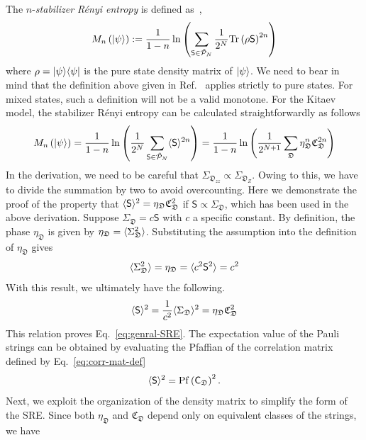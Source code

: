 The $n$-\textit{stabilizer R\'enyi entropy} is defined as~\cite{Leone-Oliviero-Hamma_2022},
\begin{equation}\label{eq:stab-renyi-def}
    M_{n}\left( | \psi \rangle \right) := 
    \frac{1}{1 - n} 
    \ln\left( 
        \sum_{\mathsf{S}\in\tilde{\mathcal{P}}_N}
        \frac{1}{2^N}
        \mathrm{Tr}\left( \rho\mathsf{S} \right)^{2n}
     \right)
\end{equation}
where $\rho = | \psi \rangle\langle \psi |$ is the pure state density matrix of $| \psi \rangle$. We need to bear in mind that the definition above given in Ref.~\cite{Leone-Oliviero-Hamma_2022} applies strictly to pure states. For mixed states, such a definition will not be a valid monotone. For the Kitaev model, the stabilizer R\'enyi entropy can be calculated straightforwardly as follows
\begin{equation}\label{eq:genral-SRE}
    M_{n}\left( | \psi \rangle \right) 
    = 
    \frac{1}{1 - n} 
    \ln\left( 
        \frac{1}{2^N} \sum_{\mathsf{S}\in\tilde{\mathcal{P}}_N}
        \langle \mathsf{S} \rangle^{2n}
     \right) 
    =
    \frac{1}{1 - n} 
    \ln\left( 
        \frac{1}{2^{N+1}}
        \sum_{\mathfrak{D}}
        \eta_\mathfrak{D}^n
        \mathfrak{C}_\mathfrak{D}^{2n}
     \right) 
\end{equation}
In the derivation, we need to be careful that $\Sigma_{\mathfrak{D}_{zz}} \propto \Sigma_{\mathfrak{D}_Z}$. Owing to this, we have to divide the summation by two to avoid overcounting. Here we demonstrate the proof of the property that $\langle \mathsf{S} \rangle^2 = \eta_\mathfrak{D}\mathfrak{C}_\mathfrak{D}^2$ if $\mathsf{S} \propto \Sigma_\mathfrak{D}$, which has been used in the above derivation.  Suppose $\Sigma_\mathfrak{D} = c\mathsf{S}$ with $c$ a specific constant. By definition, the phase $\eta_{\mathfrak{D}}$ is given by $\eta_\mathfrak{D} = \langle \Sigma_\mathfrak{D}^2 \rangle$. Substituting the assumption into the definition of $\eta_\mathfrak{D}$ gives
\[
\langle \Sigma_\mathfrak{D}^2 \rangle = \eta_\mathfrak{D} = \langle c^2\mathsf{S}^2 \rangle = c^2
\]
With this result, we ultimately have the following.
\[
\langle \mathsf{S} \rangle^2 = \frac{1}{c^2}\langle \Sigma_\mathfrak{D} \rangle^2 = \eta_\mathfrak{D}\mathfrak{C}_\mathfrak{D}^2
\]
This relation proves Eq.~\eqref{eq:genral-SRE}. The expectation value of the Pauli strings can be obtained by evaluating the Pfaffian of the correlation matrix defined by Eq.~\eqref{eq:corr-mat-def}
\[
\langle \mathsf{S} \rangle^2 = \mathrm{Pf}\left( \mathsf{C}_\mathfrak{D} \right)^2
.
\]
Next, we exploit the organization of the density matrix to simplify the form of the SRE. Since both $\eta_\mathfrak{D}$ and $\mathfrak{C}_\mathfrak{D}$ depend only on equivalent classes of the strings, we have
